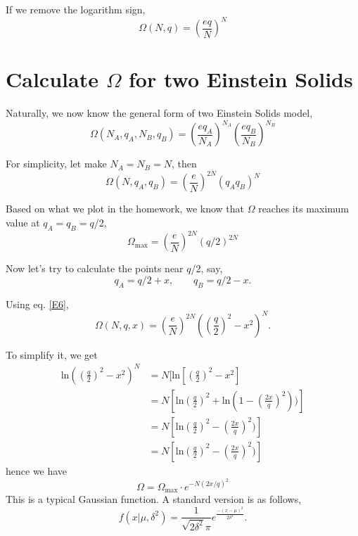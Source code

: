 If we remove the logarithm sign,
\begin{equation} \label{E4}
       \Omega(N,q) = (\frac{eq}{N})^N
\end{equation}


\section{Calculate $\Omega$ for two Einstein Solids}
Naturally, we now know the general form of two Einstein Solids model,
\begin{equation} \label{E5}
       \Omega(N_A,q_A,N_B,q_B) = (\frac{eq_A}{N_A})^{N_A} (\frac{eq_B}{N_B})^{N_B}
\end{equation}

For simplicity, let make $N_A = N_B = N $, then
\begin{equation} \label{E6}
       \Omega(N,q_A,q_B) = (\frac{e}{N})^{2N} (q_A q_B)^{N}
\end{equation}

Based on what we plot in the homework, we know that $\Omega$ reaches its maximum value at 
$q_A = q_B = q$/2,
\begin{equation}
       \Omega_\text{max} = (\frac{e}{N})^{2N} (q/2)^{2N}
\end{equation}

Now let's try to calculate the points near $q$/2, say,
\begin{equation}
  q_A = q/2+x, ~~~~~~~~~ q_B=q/2-x.
\end{equation}

Using eq. \ref{E6},
\begin{equation} \label{E7}
       \Omega(N,q,x) = (\frac{e}{N})^{2N} ((\frac{q}{2})^2-x^2)^{N}.
\end{equation}

To simplify it, we get
\begin{equation} \label{E8}
\begin{split}
       \text{ln}((\frac{q}{2})^2-x^2)^{N} 
           &= N[\text{ln}[(\frac{q}{2})^2-x^2]\\
           &= N[\text{ln}(\frac{q}{2})^2 + \text{ln}(1-(\frac{2x}{q})^2))]\\
           &= N[\text{ln}(\frac{q}{2})^2 - (\frac{2x}{q})^2)]\\
           &= N[\text{ln}(\frac{q}{2})^2 - (\frac{2x}{q})^2)]
\end{split}                                          
\end{equation}
hence we have 
\begin{equation} \label{E9}
  \Omega = \Omega_\text{max} \cdot e^{-N(2x/q)^2}
\end{equation}
This is a typical Gaussian function. A standard version is as follows,
\begin{equation}
  f(x|\mu,\delta^2) = \frac{1}{\sqrt{2\delta^2}\pi} e^\frac{-(x-\mu)^2}{2\delta^2}.
\end{equation}

